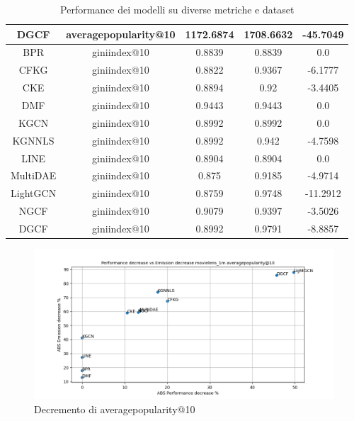 \begin{table}[H]
{\begin{tabular}{|c|c|c|c|c|}
    DGCF     & averagepopularity@10 & 1172.6874              & 1708.6632                 & -45.7049          \\\hline
    BPR      & giniindex@10        & 0.8839                  & 0.8839                    & 0.0               \\\hline
    CFKG     & giniindex@10        & 0.8822                  & 0.9367                    & -6.1777           \\\hline
    CKE      & giniindex@10        & 0.8894                  & 0.92                      & -3.4405           \\\hline
    DMF      & giniindex@10        & 0.9443                  & 0.9443                    & 0.0               \\\hline
    KGCN     & giniindex@10        & 0.8992                  & 0.8992                    & 0.0               \\\hline
    KGNNLS   & giniindex@10        & 0.8992                  & 0.942                     & -4.7598           \\\hline
    LINE     & giniindex@10        & 0.8904                  & 0.8904                    & 0.0               \\\hline
    MultiDAE & giniindex@10        & 0.875                   & 0.9185                    & -4.9714           \\\hline
    LightGCN & giniindex@10        & 0.8759                  & 0.9748                    & -11.2912          \\\hline
    NGCF     & giniindex@10        & 0.9079                  & 0.9397                    & -3.5026           \\\hline
    DGCF     & giniindex@10        & 0.8992                  & 0.9791                    &-8.8857        \\\hline
\end{tabular}
    }
    \caption{Performance dei modelli su diverse metriche e dataset}
    \end{table}


\begin{figure}[H]
    \centering
    \includegraphics[scale=0.5]{images/decrement_averagepopularity@10_movielens_1m_40_7.png}
    \caption{Decremento di averagepopularity@10}
\end{figure}

